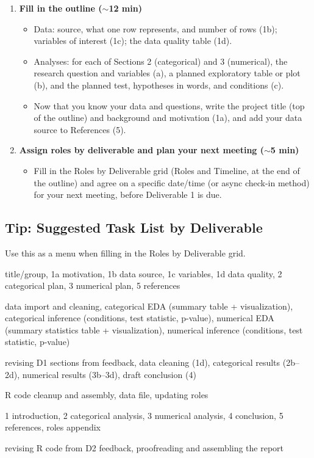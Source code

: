 \documentclass[12pt]{article}
\begin{document}
\begin{enumerate}
    \item \textbf{Fill in the outline ($\sim$12 min)}
    \begin{itemize}
        \item Data: source, what one row represents, and number of rows (1b); variables of interest (1c); the data quality table (1d).
        \item Analyses: for each of Sections 2 (categorical) and 3 (numerical), the research question and variables (a), a planned exploratory table or plot (b), and the planned test, hypotheses in words, and conditions (c).
        \item Now that you know your data and questions, write the project title (top of the outline) and background and motivation (1a), and add your data source to References (5).
    \end{itemize}

    \item \textbf{Assign roles by deliverable and plan your next meeting ($\sim$5 min)}
    \begin{itemize}
        \item Fill in the Roles by Deliverable grid (Roles and Timeline, at the end of the outline) and agree on a specific date/time (or async check-in method) for your next meeting, before Deliverable 1 is due.
    \end{itemize}
\end{enumerate}

\subsection*{Tip: Suggested Task List by Deliverable}

Use this as a menu when filling in the Roles by Deliverable grid.

\begin{description}[nosep, leftmargin=0pt, style=sameline, font=\normalfont]
    \item[\textbf{D1 --- Outline (write sections):}] title/group, 1a motivation, 1b data source, 1c variables, 1d data quality, 2 categorical plan, 3 numerical plan, 5 references
    \item[\textbf{D2 --- R analysis:}] data import and cleaning, categorical EDA (summary table + visualization), categorical inference (conditions, test statistic, p-value), numerical EDA (summary statistics table + visualization), numerical inference (conditions, test statistic, p-value)
    \item[\textbf{D2 --- Results doc:}] revising D1 sections from feedback, data cleaning (1d), categorical results (2b--2d), numerical results (3b--3d), draft conclusion (4)
    \item[\textbf{D2 --- Other:}] R code cleanup and assembly, data file, updating roles
    \item[\textbf{D3 --- Report sections:}] 1 introduction, 2 categorical analysis, 3 numerical analysis, 4 conclusion, 5 references, roles appendix
    \item[\textbf{D3 --- Other:}] revising R code from D2 feedback, proofreading and assembling the report
\end{description}
\end{document}
